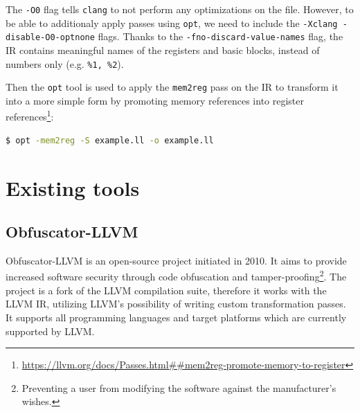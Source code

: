 \documentclass[
  digital, %
  notable,   %
  twoside, %
  nolof,     %
  nolot,     %
]{fithesis3}
\theoremstyle{definition}
\begin{document}
The \texttt{-O0} flag tells \texttt{clang} to not perform any optimizations on the file. However, to be able to additionaly apply passes using \texttt{opt}, we need to include the \texttt{-Xclang -disable-O0-optnone} flags. Thanks to the \texttt{-fno-discard-value-names} flag, the IR contains meaningful names of the registers and basic blocks, instead of numbers only (e.g. \texttt{\%1, \%2}).

Then the \texttt{opt} tool is used to apply the \texttt{mem2reg} pass on the IR to transform it into a more simple form by promoting memory references into register references\footnote{\url{https://llvm.org/docs/Passes.html##mem2reg-promote-memory-to-register}}:

\begin{lstlisting}[language=bash]
$ opt -mem2reg -S example.ll -o example.ll
\end{lstlisting}

\chapter{Existing tools}

\section{Obfuscator-LLVM} \label{sec:ollvm}

Obfuscator-LLVM is an open-source project initiated in 2010. It aims to provide increased software security through code obfuscation and tamper-proofing\footnote{Preventing a user from modifying the software against the manufacturer's wishes.}. The project is a fork of the LLVM compilation suite, therefore it works with the LLVM IR, utilizing LLVM's possibility of writing custom transformation passes. It supports all programming languages and target platforms which are currently supported by LLVM. 
\end{document}
